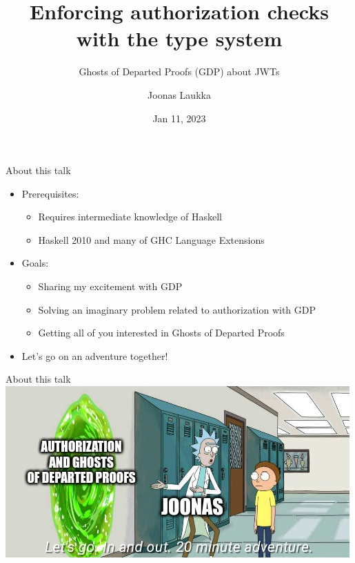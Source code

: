 \documentclass[
  9pt,
  ignorenonframetext,
]{beamer}
\title{Enforcing authorization checks with the type system}
\subtitle{Ghosts of Departed Proofs (GDP) about JWTs}
\author{Joonas Laukka}
\date{Jan 11, 2023}
\institute{Software Developer @ RELEX Solutions}
\providecommand{\tightlist}{%
  \setlength{\itemsep}{0pt}\setlength{\parskip}{0pt}}
\begin{document}
\begin{frame}
\titlepage
\end{frame}

\begin{frame}{About this talk}
\protect\hypertarget{about-this-talk}{}
\begin{itemize}
\tightlist
\item
  Prerequisites:

  \begin{itemize}
  \tightlist
  \item
    Requires intermediate knowledge of Haskell
  \item
    Haskell 2010 and many of GHC Language Extensions
  \end{itemize}
\item
  Goals:

  \begin{itemize}
  \tightlist
  \item
    Sharing my excitement with GDP
  \item
    Solving an imaginary problem related to authorization with GDP
  \item
    Getting all of you interested in Ghosts of Departed Proofs
  \end{itemize}
\item
  Let's go on an adventure together!
\end{itemize}









\end{frame}

\begin{frame}{About this talk}
\protect\hypertarget{about-this-talk-1}{}
\includegraphics[width=\textwidth,height=0.8\textheight]{resources/meme-cropped.png}
\end{frame}
\end{document}
